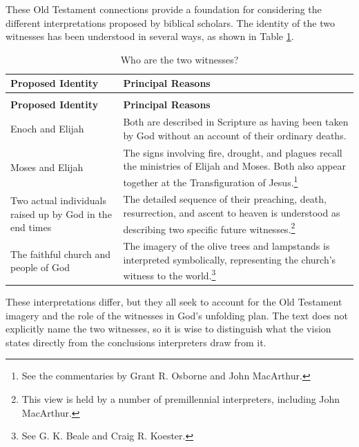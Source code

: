 \normalsize

These Old Testament connections provide a foundation for considering the different interpretations proposed by biblical scholars. The identity of the two witnesses has been understood in several ways, as shown in Table \ref{tab:two-witnesses}.

{
\small
\renewcommand{\arraystretch}{1}

\begin{longtable}{
    @{}
    >{\raggedright\arraybackslash}p{} |
    >{\raggedright\arraybackslash}p{}
    @{}
}
\caption{Who are the two witnesses?}
\label{tab:two-witnesses} \\
\hline
\textbf{Proposed Identity} & \textbf{Principal Reasons} \\
\hline
\endfirsthead

\multicolumn{2}{@{}l}{\small\itshape Table~\thetable\ (continued)} \\
\hline
\textbf{Proposed Identity} & \textbf{Principal Reasons} \\
\hline
\endhead

\hline
\endfoot

\hline
\endlastfoot

Enoch and Elijah
& Both are described in Scripture as having been taken by God without an account of their ordinary deaths. \\
\hline
Moses and Elijah
& The signs involving fire, drought, and plagues recall the ministries of Elijah and Moses. Both also appear together at the Transfiguration of Jesus.\footnote{See the commentaries by Grant R. Osborne and John MacArthur.} \\
\hline
Two actual individuals raised up by God in the end times
& The detailed sequence of their preaching, death, resurrection, and ascent to heaven is understood as describing two specific future witnesses.\footnote{This view is held by a number of premillennial interpreters, including John MacArthur.} \\
\hline
The faithful church and people of God
& The imagery of the olive trees and lampstands is interpreted symbolically, representing the church's witness to the world.\footnote{See G. K. Beale and Craig R. Koester.} \\

\end{longtable}
}


\normalsize

These interpretations differ, but they all seek to account for the Old Testament imagery and the role of the witnesses in God's unfolding plan. The text does not explicitly name the two witnesses, so it is wise to distinguish what the vision states directly from the conclusions interpreters draw from it.

